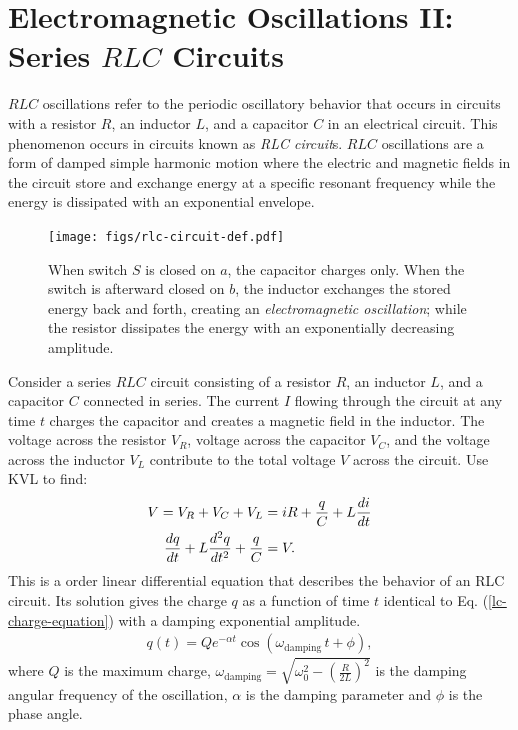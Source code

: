 \documentclass[12pt,b4paper]{article}
\begin{document}
\section{Electromagnetic Oscillations II: Series $RLC$ Circuits}
$RLC$ oscillations refer to the periodic oscillatory behavior that occurs in circuits with a resistor $R$, an inductor $L$, and a capacitor $C$ in an electrical circuit. This phenomenon occurs in circuits known as \textit{RLC circuit}s. $RLC$ oscillations are a form of damped simple harmonic motion where the electric and magnetic fields in the circuit store and exchange energy at a specific resonant frequency while the energy is dissipated with an exponential envelope.
\begin{figure}[H]
    \centering
    \texttt{[image: figs/rlc-circuit-def.pdf]}
    \caption{When switch $S$ is closed on $a$, the capacitor charges only. When the switch is afterward closed on $b$, the inductor exchanges the stored energy back and forth, creating an \textit{electromagnetic oscillation}; while the resistor dissipates the energy with an exponentially decreasing amplitude.}
    \label{fig:rlc-circuit-def}
\end{figure}
Consider a series $RLC$ circuit consisting of a resistor $R$, an inductor $L$, and a capacitor $C$ connected in series. The current $I$ flowing through the circuit at any time $t$ charges the capacitor and creates a magnetic field in the inductor. The voltage across the resistor $V_R$, voltage across the capacitor $V_C$, and the voltage across the inductor $V_L$ contribute to the total voltage $V$ across the circuit. Use KVL to find:
\begin{align}
    V=V_R+V_C+V_L&=iR+\frac{q}{C}+L\frac{di}{dt}\notag\\
    \frac{dq}{dt}+L\frac{d^2q}{dt^2}+\frac{q}{C}&=V.
\end{align}
This is a  order linear differential equation that describes the behavior of an RLC circuit. Its solution gives the charge $q$ as a function of time $t$ identical to Eq. (\ref{lc-charge-equation}) with a damping exponential amplitude.
\begin{align}
    q(t)=Qe^{-\alpha t}\cos{(\omega_\text{damping}\,t + \phi)},\label{eq:rlc-charge-equation}
\end{align}
where $Q$ is the maximum charge, $\displaystyle\omega_\text{damping}=\sqrt{\omega_0^2-\left(\frac{R}{2L}\right)^2}$ is the damping angular frequency of the oscillation, $\alpha$ is the damping parameter and $\phi$ is the phase angle.
\end{document}
